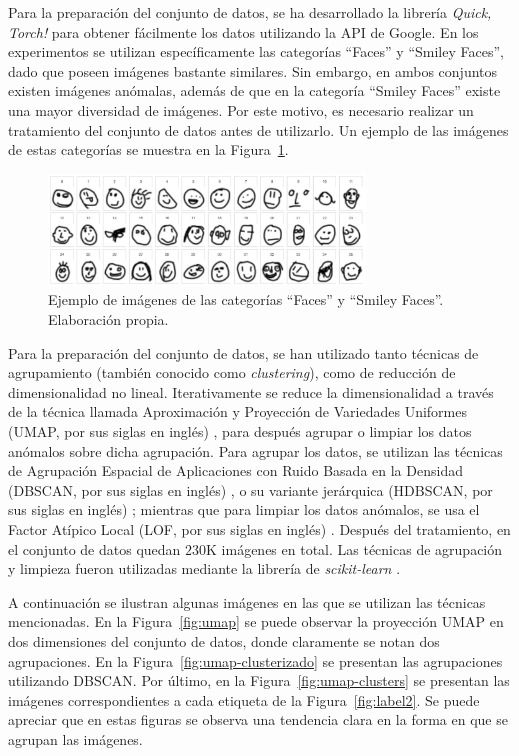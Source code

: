 Para la preparación del conjunto de datos, se ha desarrollado la librería \textit{Quick, Torch!} \cite{munoz2023quicktorch} para obtener fácilmente los datos utilizando la API de Google.
En los experimentos se utilizan específicamente las categorías ``Faces'' y ``Smiley Faces'', dado que poseen imágenes bastante similares. Sin embargo, en ambos conjuntos existen imágenes anómalas, además de que en la categoría ``Smiley Faces'' existe una mayor diversidad de imágenes. Por este motivo, es necesario realizar un tratamiento del conjunto de datos antes de utilizarlo. Un ejemplo de las imágenes de estas categorías se muestra en la Figura~\ref{fig:quick-draw-caras}.

\begin{figure}[htbp]
    \centering
    \includegraphics[width=0.75\textwidth]{img/quick-draw/caras.jpg}
    \caption{Ejemplo de imágenes de las categorías ``Faces'' y ``Smiley Faces''. Elaboración propia.}
    \label{fig:quick-draw-caras}
\end{figure}


Para la preparación del conjunto de datos, se han utilizado tanto técnicas de agrupamiento (también conocido como \textit{clustering}), como de reducción de dimensionalidad no lineal.
Iterativamente se reduce la dimensionalidad a través de la técnica llamada Aproximación y Proyección de Variedades Uniformes (UMAP, por sus siglas en inglés) \cite{mcinnes2018umap}, para después agrupar o limpiar los datos anómalos sobre dicha agrupación. Para agrupar los datos, se utilizan las técnicas de Agrupación Espacial de Aplicaciones con Ruido Basada en la Densidad (DBSCAN, por sus siglas en inglés) \cite{ester1996density}, o su variante jerárquica (HDBSCAN, por sus siglas en inglés) \cite{campello2013density};
mientras que para limpiar los datos anómalos, se usa el Factor Atípico Local (LOF, por sus siglas en inglés) \cite{breunig2000lof}. Después del tratamiento, en el conjunto de datos quedan $230$K imágenes en total. Las técnicas de agrupación y limpieza fueron utilizadas mediante la librería de \textit{scikit-learn} \cite{sklearn}.

A continuación se ilustran algunas imágenes en las que se utilizan las técnicas mencionadas.
En la Figura~\ref{fig:umap} se puede observar la proyección UMAP en dos dimensiones del conjunto de datos, donde claramente se notan dos agrupaciones. En la Figura~\ref*{fig:umap-clusterizado} se presentan las agrupaciones utilizando DBSCAN. Por último, en la Figura~\ref*{fig:umap-clusters} se presentan las imágenes correspondientes a cada etiqueta de la Figura~\ref*{fig:label2}. Se puede apreciar que en estas figuras se observa una tendencia clara en la forma en que se agrupan las imágenes.

